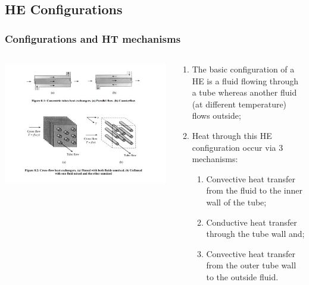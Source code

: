 \documentclass[10pt,compress,unknownkeysallowed]{beamer}
\begin{document}
\subsection{HE Configurations}

\begin{frame}
  \frametitle{Configurations and HT mechanisms}
    \begin{columns}
       \begin{column}[l]{0.5\linewidth}
         \includegraphics[width=1.3\columnwidth,clip]{./Pics/HeatExchangers_Classification}
       \end{column}
       \begin{column}[l]{0.5\linewidth}
         \begin{enumerate}\scriptsize
            \item<1-> The basic configuration of a HE is a fluid flowing through a tube whereas another fluid (at different temperature) flows outside;
            \item<2-> Heat through this HE configuration occur via 3 mechanisms:
              \begin{enumerate}\scriptsize
                 \item<2-> Convective heat transfer from the fluid to the inner wall of the tube;
                 \item<2-> Conductive heat transfer through the tube wall and;
                 \item<2-> Convective heat transfer from the outer tube wall to the outside fluid.
              \end{enumerate}

\end{enumerate}
\end{column}
\end{columns}
\end{frame}
\end{document}
